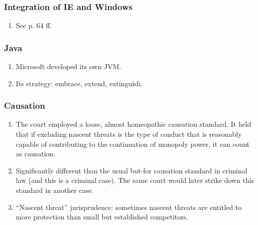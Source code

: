 \subsubsection{Integration of IE and Windows}

\begin{enumerate}
    \item See p. 64 ff.
\end{enumerate}

\subsubsection{Java}

\begin{enumerate}
    \item Microsoft developed its own JVM.
    \item Its strategy: embrace, extend, extinguish.
\end{enumerate}

\subsubsection{Causation}

\begin{enumerate}
    \item The court employed a loose, almost homeopathic causation standard. 
    It held that if excluding nascent threats is the type of conduct that is 
    reasonably capable of contributing to the continuation of monopoly power, 
    it can count as causation.
    \item Significantly different than the usual but-for causation standard in 
    criminal law (and this is a criminal case). The same court would later 
    strike down this standard in another case.
    \item ``Nascent threat'' jurisprudence: sometimes nascent threats are 
    entitled to more protection than small but established competitors.
\end{enumerate}
